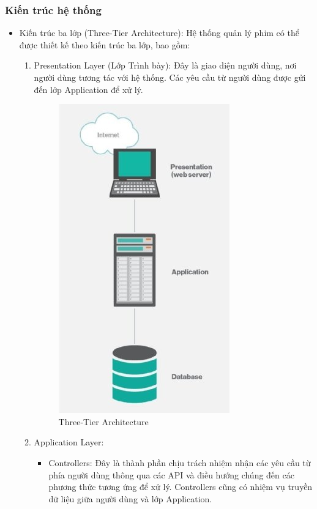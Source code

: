 \documentclass[12pt]{article}
\begin{document}
\subsubsection{Kiến trúc hệ thống}
\begin{itemize}
    \item Kiến trúc ba lớp (Three-Tier Architecture):  Hệ thống quản lý phim có thể được thiết kế theo kiến trúc ba lớp, bao gồm:
    \begin{enumerate}
        \item Presentation Layer (Lớp Trình bày): Đây là giao diện người dùng, nơi người dùng tương tác với hệ thống. Các yêu cầu từ người dùng được gửi đến lớp Application để xử lý.
        \begin{figure}[H]
            \centering
            \includegraphics[scale=0.5]{Figs/three_tier_arch_half_column_mobile.jpg}
            \caption{Three-Tier Architecture}
        \end{figure}
        \item Application Layer:
            \begin{itemize}
                \item     Controllers: Đây là thành phần chịu trách nhiệm nhận các yêu cầu từ phía người dùng thông qua các API và điều hướng chúng đến các phương thức tương ứng để xử lý. Controllers cũng có nhiệm vụ truyền dữ liệu giữa người dùng và lớp Application.


\end{itemize}
\end{enumerate}
\end{itemize}
\end{document}
